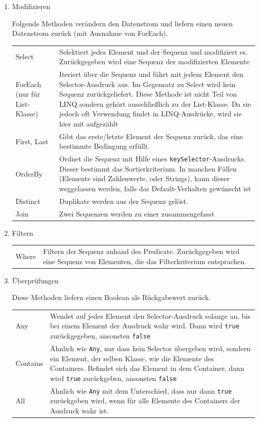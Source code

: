 \begin{enumerate}
\item Modifizieren

Folgende Methoden verändern den Datenstrom und liefern einen neuen Datenstrom
zurück (mit Ausnahme von ForEach).

\bigskip
\begin{tabularx}{\textwidth}{p{130 pt}|X}
Select & Selektiert jedes Element und der Sequenz und modifiziert es. Zurückgegeben wird eine Sequenz der modifizierten Elemente\\
ForEach (nur für List-Klasse) & Iteriert über die Sequenz und führt mit jedem Element den Selector-Ausdruck aus. Im Gegensatz zu Select wird kein Sequenz zurückgeliefert. Diese Methode ist nicht Teil von LINQ sondern gehört ausschließlich zu der List-Klasse. Da sie jedoch oft Verwendung findet in LINQ-Ausdrücke, wird sie hier mit aufgezählt\\
First,  Last & Gibt das erste/letzte Element der Sequenz zurück, das eine bestimmte Bedingung erfüllt.\\
OrderBy & Ordnet die Sequenz mit Hilfe eines \texttt{keySelector}-Ausdrucks. Dieser bestimmt das Sortierkriterium. In manchen Fällen (Elemente sind Zahlenwerte, oder Strings), kann dieser weggelassen werden, falls das Default-Verhalten gewünscht ist\\
Distinct & Duplikate werden aus der Sequenz gelöst.\\
Join & Zwei Sequenzen werden zu einer zusammengefasst\\
\end{tabularx}


\item Filtern

\bigskip
\begin{tabularx}{\textwidth}{p{130 pt}|X}
Where & Filtern der Sequenz anhand des Predicate. Zurückgegeben wird eine Sequenz von Elementen, die das Filterkriterium entsprachen.\\
\end{tabularx}

\item Überprüfungen

Diese Methoden liefern einen Boolean als Rückgabewert zurück.

\bigskip
\begin{tabularx}{\textwidth}{p{130 pt}|X}
Any & Wendet auf jedes Element den Selector-Ausdruck solange an, bis bei einem Element der Ausdruck wahr wird. Dann wird \texttt{true} zurückgegeben, ansonsten \texttt{false}\\
Contains & Ähnlich wie \texttt{Any}, nur dass kein Selector übergeben wird, sondern ein Element, der selben Klasse, wie die Elemente des Containers. Befindet sich das Element in dem Container, dann wird \texttt{true} zurückgeben, ansonsten \texttt{false}\\
All & Ähnlich wie \texttt{Any} mit dem Unterschied, dass nur dann \texttt{true} zurückgeben wird, wenn für alle Elemente des Containers der Ausdruck wahr ist.\\
\end{tabularx}


\end{enumerate}
